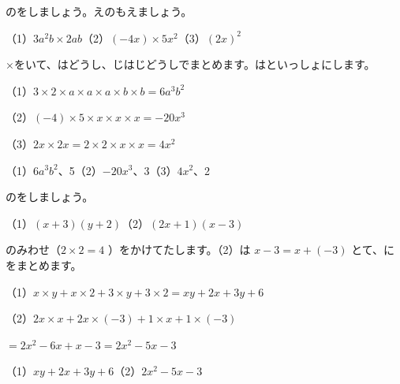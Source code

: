 
\begin{reidai}
のをしましょう。えのもえましょう。\par
（1）$3a^2b\times2ab$\qquad（2）$(-4x)\times5x^2$\qquad（3）$(2x)^2$\par
\kangaekata ×をいて、はどうし、じはじどうしでまとめます。はといっしょにします。\par
\shiki（1）\nobreak $3\times2\times a\times a\times a\times b\times b=6a^3b^2$\par
\hspace*{2.6\zw}（2）\nobreak $(-4)\times5\times x\times x\times x=-20x^3$\par
\hspace*{2.6\zw}（3）\nobreak $2x\times2x=2\times2\times x\times x=4x^2$\par
\kotae（1）\nobreak $6a^3b^2$、5\qquad（2）\nobreak $-20x^3$、3\qquad（3）\nobreak $4x^2$、2
\end{reidai}

\begin{reidai}
のをしましょう。\par
（1）$(x+3)(y+2)$\qquad（2）$(2x+1)(x-3)$\par
\kangaekata {}のみわせ（$2\times2=4$ ）をかけてたします。（2）は $x-3=x+(-3)$ とて、にをまとめます。\par
\shiki（1）\nobreak $x\times y+x\times2+3\times y+3\times2=xy+2x+3y+6$\par
\hspace*{2.6\zw}（2）\nobreak $2x\times x+2x\times(-3)+1\times x+1\times(-3)$\par
\hspace*{2.6\zw}\phantom{（2）}$=2x^2-6x+x-3=2x^2-5x-3$\par
\kotae（1）\nobreak $xy+2x+3y+6$\qquad（2）\nobreak $2x^2-5x-3$
\end{reidai}

